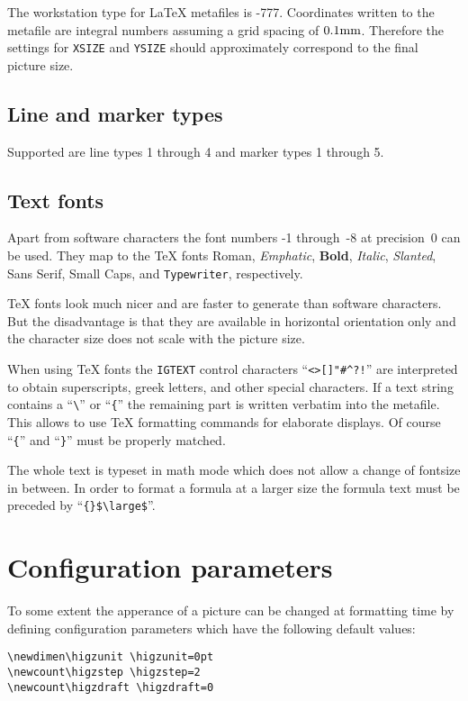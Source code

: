 The workstation type for \LaTeX{} metafiles is -777.
Coordinates written to the metafile are integral numbers assuming
a grid spacing of $0.1 {\rm mm}$.
Therefore the settings for {\tt XSIZE} and {\tt YSIZE} should approximately
correspond to the final picture size.

\subsection{Line and marker types}

Supported are line types 1 through 4 and marker types 1 through 5.

\subsection{Text fonts}

Apart from software characters the font numbers -1 through~-8 at 
precision~0 can be used.
They map to the \TeX{} fonts
{\rm Roman}, {\em Emphatic}, {\bf Bold}, {\it Italic}, {\sl Slanted},
{\sf Sans Serif}, {\sc Small Caps}, and {\tt Typewriter}, respectively.

\TeX{} fonts look much nicer and are faster to generate than
software characters.
But the disadvantage is that they are available in horizontal orientation only
and the character size does not scale with the picture size.

When using \TeX{} fonts the {\tt IGTEXT} control characters 
``\verb'<>[]"#^?!''' are interpreted to obtain superscripts, greek letters,
and other special characters.
If a text string contains a ``\verb'\''' or ``\verb'{''' the remaining part
is written verbatim into the metafile.
This allows to use \TeX{} formatting commands for elaborate displays.
Of course ``\verb'{''' and ``\verb'}''' must be properly matched.

The whole text is typeset in math mode which does not allow a change of
fontsize in between.
In order to format a formula at a larger size the formula text must be
preceded by ``\verb'{}$\large$'''.

\section{Configuration parameters}

To some extent the apperance of a picture can be changed at formatting time
by defining configuration parameters which have the following default values:

\begin{verbatim}
\newdimen\higzunit \higzunit=0pt
\newcount\higzstep \higzstep=2
\newcount\higzdraft \higzdraft=0
\end{verbatim}

